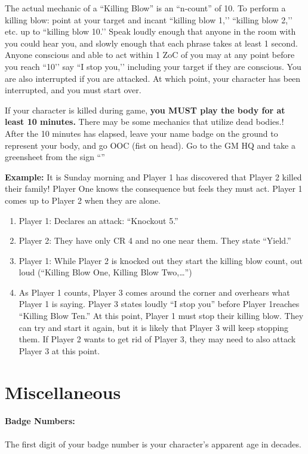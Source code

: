 \documentclass[sheet]{GL2020}
\begin{document}
The actual mechanic of a ``Killing Blow'' is an ``n-count'' of 10. To perform a killing blow: point at your target and incant ``killing blow 1,'’ ``killing blow 2,'’ etc. up to ``killing blow 10.'’ Speak loudly enough that anyone in the room with you could hear you, and slowly enough that each phrase takes at least 1 second. Anyone conscious and able to act within 1 ZoC of you may at any point before you reach ``10'’ say ``I stop you,'’ including your target if they are conscious. You are also interrupted if you are attacked. At which point, your character has been interrupted, and you must start over.

If your character is killed during game, \textbf{you MUST play the body for at least 10 minutes.} There may be some mechanics that utilize dead bodies.! After the 10 minutes has elapsed, leave your name badge on the ground to represent your body, and go OOC (fist on head). Go to the GM HQ and take a greensheet from the sign ``\sMurdered{}''

\textbf{Example:}\newline
It is Sunday morning and Player 1 has discovered that Player 2 killed their family! Player One knows the consequence but feels they must act. Player 1 comes up to Player 2 when they are alone. 
\begin{enumerate}
	\item Player 1: Declares an attack: ``Knockout 5.'' 
	\item Player 2: They have only CR 4 and no one near them. They state ``Yield.''
	\item Player 1: While Player 2 is knocked out they start the killing blow count, out loud (``Killing Blow One, Killing Blow Two,\ldots'')
	\item As Player 1 counts, Player 3 comes around the corner and overhears what Player 1 is saying. Player 3 states loudly ``I stop you'' before Player 1reaches ``Killing Blow Ten.'' At this point, Player 1 must stop their killing blow. They can try and start it again, but it is likely that Player 3 will keep stopping them. If Player 2 wants to get rid of Player 3, they may need to also attack Player 3 at this point.
\end{enumerate}

\section{Miscellaneous}

\paragraph{Badge Numbers:} The first digit of your badge number is your character's apparent age in decades.
\end{document}
